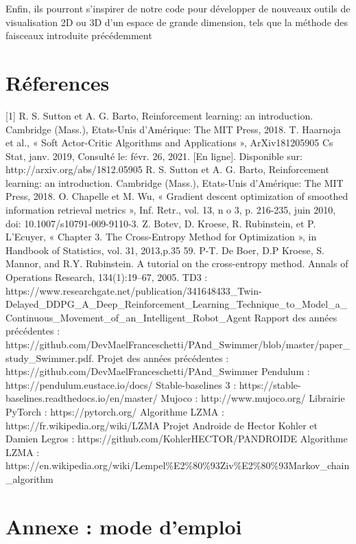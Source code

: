 \documentclass[12pt]{article}
\begin{document}
Enfin, ils pourront s'inspirer de notre code pour développer de nouveaux outils de visualisation 2D ou 3D d'un espace de grande dimension, tels que la méthode des faisceaux introduite précédemment \\


\section{Réferences} \label{second}
[1] R. S. Sutton et A. G. Barto, Reinforcement learning: an introduction. Cambridge (Mass.),
Etats-Unis d’Amérique: The MIT Press, 2018. \label{[1]} \newline
[2] T. Haarnoja et al., « Soft Actor-Critic Algorithms and Applications », ArXiv181205905 Cs
Stat, janv. 2019, Consulté le: févr. 26, 2021. [En ligne]. Disponible sur:
http://arxiv.org/abs/1812.05905   \label{[2]} \newline
[3] R. S. Sutton et A. G. Barto, Reinforcement learning: an introduction. Cambridge (Mass.),
Etats-Unis d’Amérique: The MIT Press, 2018.\label{[3]} \newline
[4] O. Chapelle et M. Wu, « Gradient descent optimization of smoothed information retrieval
metrics », Inf. Retr., vol. 13, n
o 3, p. 216-235, juin 2010, doi: 10.1007/s10791-009-9110-3.\label{[4]} \newline
[5] Z. Botev, D. Kroese, R. Rubinstein, et P. L’Ecuyer, « Chapter 3. The Cross-Entropy
Method for Optimization », in Handbook of Statistics, vol. 31, 2013,p.35 59. \label{[5]} \newline
[6] P-T. De Boer, D.P Kroese, S. Mannor, and R.Y. Rubinstein. A tutorial on the cross-entropy method. Annals of Operations Research, 134(1):19–67, 2005.\label{[6]} \newline
[7] TD3 : https://www.researchgate.net/publication/341648433\_Twin-Delayed\_DDPG\_A\_Deep\_Reinforcement\_Learning\_Technique\_to\_Model\_a\_Continuous\_Movement\_of\_an\_Intelligent\_Robot\_Agent \label{[7]} \newline
[8] Rapport des années précédentes : https://github.com/DevMaelFranceschetti/PAnd\_Swimmer/blob/master/paper\_study\_Swimmer.pdf. \label{[8]} \newline
[9] Projet des années précédentes : https://github.com/DevMaelFranceschetti/PAnd\_Swimmer \label{[9]}\newline
[10] Pendulum : https://pendulum.eustace.io/docs/ \label{[10]}\newline
[11] Stable-baselines 3 : https://stable-baselines.readthedocs.io/en/master/  \label{[11]}\newline
[12] Mujoco : http://www.mujoco.org/ \label{[12]}\newline
[13] Librairie PyTorch : https://pytorch.org/  \label {[13]}\newline
[14] Algorithme LZMA : https://fr.wikipedia.org/wiki/LZMA \label{[14]}\newline
[15] Projet Androide de Hector Kohler et Damien Legros : https://github.com/KohlerHECTOR/PANDROIDE \label{[15]}\newline 
[16] Algorithme LZMA : https://en.wikipedia.org/wiki/Lempel\%E2\%80\%93Ziv\%E2\%80\%93Markov\_chain\_algorithm \label{[16]} \newline

\newpage
\section{Annexe : mode d'emploi}
\end{document}
